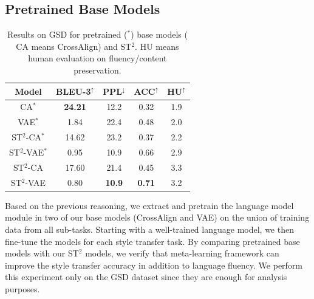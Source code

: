 \subsection{Pretrained Base Models}
\label{sec:pretrain}
\begin{table}[ht]\footnotesize
	\centering
	\begin{tabular}{c|cccc}
		\hline
		\textbf{Model} & \textbf{BLEU-3}$^\uparrow$ & \textbf{PPL}$^\downarrow$ & \textbf{ACC}$^\uparrow$ & \textbf{HU}$^\uparrow$ \\
		\hline
		CA$^*$ &\textbf{24.21}   & 12.2 & 0.32 & 1.9 \\
		VAE$^*$ &1.84   & 22.4 & 0.48 & 2.0 \\
		\hline
		ST$^2$-CA$^*$ &14.62   & 23.2 & 0.37 &2.2  \\
		ST$^2$-VAE$^*$ &0.95   & 10.9 & 0.66  &2.9  \\
		\hline
		ST$^2$-CA & 17.60  & 21.4 & 0.45 & 3.3 \\
		ST$^2$-VAE & 0.80  & \textbf{10.9} & \textbf{0.71} & 3.2 \\
		\hline
	\end{tabular}
	\caption{Results on GSD for pretrained ($^*$) base models ( CA means CrossAlign) and ST$^2$. HU means human evaluation on fluency/content preservation.}\label{tb:exp2}
\end{table}
Based on the previous reasoning, we extract and pretrain the language model module in two of our base models (CrossAlign and VAE) on the union of training data from all sub-tasks. Starting with a well-trained language model, we then fine-tune the models for each style transfer task. By comparing pretrained base models with our ST$^2$ models, we verify that meta-learning framework can improve the style transfer accuracy in addition to language fluency. We perform this experiment only on the GSD dataset since they are enough for analysis purposes.

